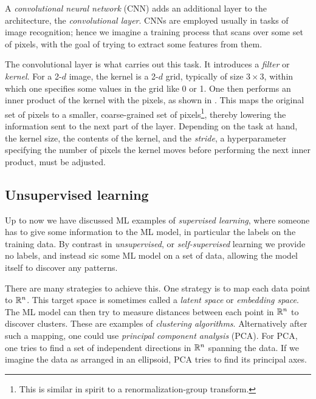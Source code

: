 A {\it convolutional neural network} (CNN) 
adds an additional layer to the architecture, the 
{\it convolutional layer}. CNNs are employed usually 
in tasks of image recognition; hence we imagine a training process that scans
over some set of pixels, with the goal of trying to extract some features from
them.

The convolutional layer is what carries out this task. It introduces a 
{\it filter} or {\it kernel}. For a 2-$d$ image, the
kernel is a 2-$d$ grid, typically of size $3\times 3$, within which one
specifies some values in the grid like 0 or 1. One then performs an inner
product of the kernel with the pixels, as shown in . This maps
the original set of pixels to a smaller, coarse-grained set of 
pixels\footnote{This is similar in spirit to a renormalization-group transform.},
thereby lowering the information sent to the next part of the layer.
Depending on the task at hand, the kernel size, the contents of the kernel,
and the {\it stride}, a hyperparameter specifying 
the number of pixels the kernel moves before
performing the next inner product, must be adjusted.

\subsection{Unsupervised learning}

Up to now we have discussed ML examples of 
{\it supervised learning},
where someone has to give some information to the ML model, in particular the
labels on the training data. By contrast in {\it unsupervised}, 
or {\it self-supervised} learning we provide no
labels, and instead sic some
ML model on a set of data, allowing the model itself to discover any patterns.

There are many strategies to achieve this. One strategy is to map each data
point to $\mathbb{R}^n$. This target space is sometimes called a 
{\it latent space}
or {\it embedding space}.
The ML model can then try to measure distances between each
point in $\mathbb{R}^n$ to discover clusters. These are examples of {\it clustering
algorithms}.
Alternatively after such a mapping, one could use 
{\it principal component analysis} (PCA).
For PCA, one tries to find a set of independent directions in $\mathbb{R}^n$ spanning
the data. If we imagine the data as arranged in an ellipsoid, PCA tries to
find its principal axes.


